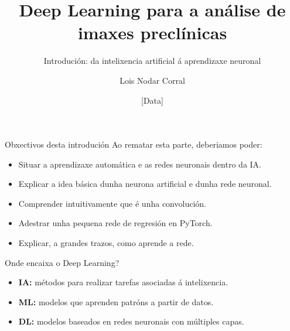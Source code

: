 \documentclass[aspectratio=169,10pt]{beamer}
\title[Introdución ao Deep Learning]{Deep Learning para a análise de imaxes preclínicas}
\subtitle{Introdución: da intelixencia artificial á aprendizaxe neuronal}
\author{Lois Nodar Corral}
\institute{[Institución / grupo de investigación]}
\date{[Data]}
\begin{document}
\begin{frame}
  \titlepage
\end{frame}

\begin{frame}{Obxectivos desta introdución}
  Ao rematar esta parte, deberiamos poder:
  \begin{itemize}
    \item Situar a aprendizaxe automática e as redes neuronais dentro da IA.
    \item Explicar a idea básica dunha neurona artificial e dunha rede neuronal.
    \item Comprender intuitivamente que é unha convolución.
    \item Adestrar unha pequena rede de regresión en PyTorch.
    \item Explicar, a grandes trazos, como aprende a rede.
  \end{itemize}
\end{frame}

\begin{frame}{Onde encaixa o Deep Learning?}
  \begin{center}
  \end{center}
  \begin{itemize}
    \item \textbf{IA:} métodos para realizar tarefas asociadas á intelixencia.
    \item \textbf{ML:} modelos que aprenden patróns a partir de datos.
    \item \textbf{DL:} modelos baseados en redes neuronais con múltiples capas.
  \end{itemize}
\end{frame}
\end{document}
